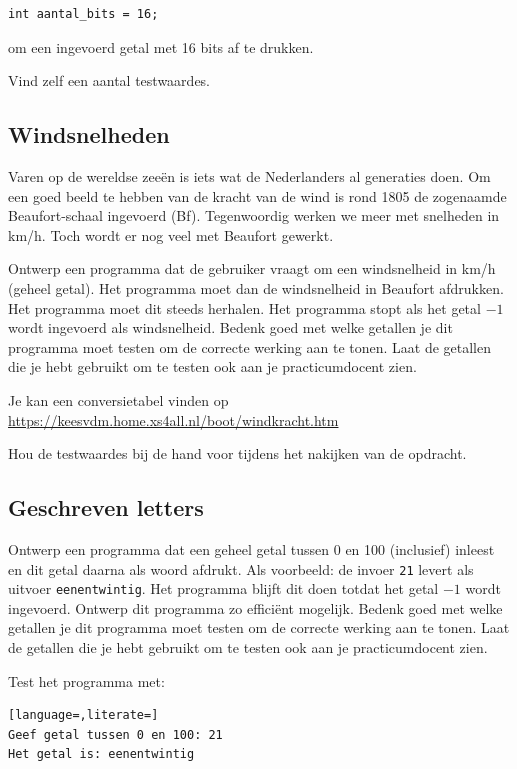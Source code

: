 \documentclass[a4paper,10pt,fleqn,twoside]{article}
\begin{document}
\begin{lstlisting}
int aantal_bits = 16;
\end{lstlisting}

om een ingevoerd getal met 16 bits af te drukken.

Vind zelf een aantal testwaardes. 

\subsection{Windsnelheden}
Varen op de wereldse zeeën is iets wat de Nederlanders al generaties doen. Om een goed beeld te hebben van de kracht van de wind is rond 1805 de zogenaamde Beaufort-schaal ingevoerd (Bf). Tegenwoordig werken we meer met snelheden in km/h. Toch wordt er nog veel met Beaufort gewerkt.

Ontwerp een programma dat de gebruiker vraagt om een windsnelheid in km/h (geheel getal). Het programma moet dan de windsnelheid in Beaufort afdrukken. Het programma moet dit steeds herhalen. Het programma stopt als het getal $-1$ wordt ingevoerd als windsnelheid. Bedenk goed met welke getallen je dit programma moet testen om de correcte werking aan te tonen. Laat de getallen die je hebt gebruikt om te testen ook aan je practicumdocent zien.

Je kan een conversietabel vinden op \url{https://keesvdm.home.xs4all.nl/boot/windkracht.htm}

Hou de testwaardes bij de hand voor tijdens het nakijken van de opdracht.

\subsection{Geschreven letters}
Ontwerp een programma dat een geheel getal tussen 0 en 100 (inclusief) inleest en dit getal daarna als woord afdrukt. Als voorbeeld: de invoer \texttt{21} levert als uitvoer \texttt{eenentwintig}. Het programma blijft dit doen totdat het getal $-1$ wordt ingevoerd. Ontwerp dit programma zo efficiënt mogelijk. Bedenk goed met welke getallen je dit programma moet testen om de correcte werking aan te tonen. Laat de getallen die je hebt gebruikt om te testen ook aan je practicumdocent zien.

Test het programma met:

\begin{lstlisting}[language=,literate=]
Geef getal tussen 0 en 100: 21
Het getal is: eenentwintig
\end{lstlisting}
\end{document}
